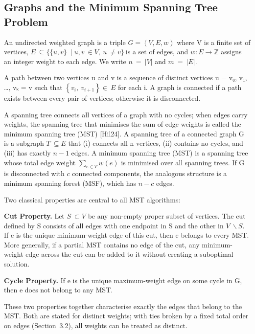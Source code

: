 \documentclass[11pt]{article}
\theoremstyle{plain}
\theoremstyle{remark}
\begin{document}
\subsection{Graphs and the Minimum Spanning Tree Problem}

An undirected weighted graph is a triple \(G = (V,E,w)\) where V is a
finite set of vertices,
\(E\  \subseteq \text{\{\{}u,v\text{\}}\  \mid u,v\  \in V,\ u\  \neq v\text{\}}\ \)is
a set of edges, and \(w:E \rightarrow \mathbb{Z}\) assigns an integer
weight to each edge. We write \(n\  = \ |V|\) and \(m\  = \ |E|\).

A path between two vertices u and v is a sequence of distinct vertices u
= v₀, v₁, \ldots, vₖ = v such that
\(\left\{ v_{i},\ v_{i + 1} \right\} \in \ E\) for each i. A graph is
connected if a path exists between every pair of vertices; otherwise it
is disconnected.

A spanning tree connects all vertices of a graph with no cycles; when
edges carry weights, the spanning tree that minimises the sum of edge
weights is called the minimum spanning tree (MST) {[}Hil24{]}. A
spanning tree of a connected graph G is a subgraph \(T\  \subseteq E\)
that (i) connects all n vertices, (ii) contains no cycles, and (iii) has
exactly \(n - 1\) edges. A minimum spanning tree (MST) is a spanning
tree whose total edge weight \(\sum_{e \in T}^{}{w(e)}\) is minimised
over all spanning trees. If G is disconnected with \(c\) connected
components, the analogous structure is a minimum spanning forest (MSF),
which has \(n - c\) edges.

Two classical properties are central to all MST algorithms:

\textbf{Cut Property.} Let \(S\  \subset V\) be any non-empty proper
subset of vertices. The cut defined by S consists of all edges with one
endpoint in S and the other in \(V\  \smallsetminus S\). If e is the
unique minimum-weight edge of this cut, then e belongs to every MST.
More generally, if a partial MST contains no edge of the cut, any
minimum-weight edge across the cut can be added to it without creating
a suboptimal solution.

\textbf{Cycle Property.} If e is the unique maximum-weight edge on some
cycle in G, then e does not belong to any MST.

These two properties together characterise exactly the edges that belong
to the MST. Both are stated for distinct weights; with ties broken by a
fixed total order on edges (Section~3.2), all weights can be treated as
distinct.
\end{document}
